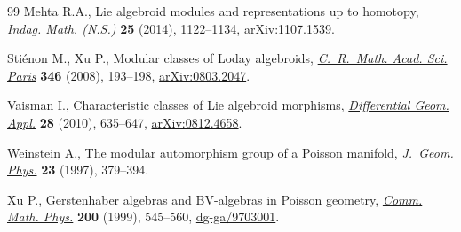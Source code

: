 \documentclass[11pt]{article}
\numberwithin{equation}{section}
\newcommand{\8}{\infty}
\begin{document}
\begin{thebibliography}{99}
Mehta R.A., Lie algebroid modules and representations up to homotopy,
 \href{https://doi.org/10.1016/j.indag.2014.07.013}{\textit{Indag. Math. (N.S.)}} \textbf{25} (2014), 1122--1134,
 \href{https://arxiv.org/abs/1107.1539}{arXiv:1107.1539}.

Sti\'{e}non M., Xu P., Modular classes of {L}oday algebroids,
 \href{https://doi.org/10.1016/j.crma.2007.12.012}{\textit{C.~R.~Math. Acad. Sci. Paris}} \textbf{346} (2008), 193--198,
 \href{https://arxiv.org/abs/0803.2047}{arXiv:0803.2047}.

Vaisman I., Characteristic classes of {L}ie algebroid morphisms,
 \href{https://doi.org/10.1016/j.difgeo.2010.01.001}{\textit{Differential Geom. Appl.}} \textbf{28} (2010), 635--647,
 \href{https://arxiv.org/abs/0812.4658}{arXiv:0812.4658}.

Weinstein A., The modular automorphism group of a {P}oisson manifold,
 \href{https://doi.org/10.1016/S0393-0440(97)80011-3}{\textit{J.~Geom. Phys.}} \textbf{23} (1997), 379--394.

Xu P., Gerstenhaber algebras and {BV}-algebras in {P}oisson geometry,
 \href{https://doi.org/10.1007/s002200050540}{\textit{Comm. Math. Phys.}} \textbf{200} (1999), 545--560,
 \href{https://arxiv.org/abs/dg-ga/9703001}{dg-ga/9703001}.

\end{thebibliography}
\end{document}
